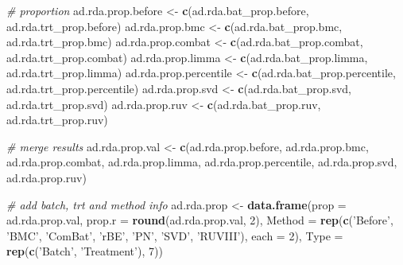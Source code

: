 \documentclass[]{book}
\newenvironment{Shaded}{\begin{snugshade}}{\end{snugshade}}
\newcommand{\KeywordTok}[1]{\textcolor[rgb]{0.13,0.29,0.53}{\textbf{#1}}}
\newcommand{\DataTypeTok}[1]{\textcolor[rgb]{0.13,0.29,0.53}{#1}}
\newcommand{\DecValTok}[1]{\textcolor[rgb]{0.00,0.00,0.81}{#1}}
\newcommand{\StringTok}[1]{\textcolor[rgb]{0.31,0.60,0.02}{#1}}
\newcommand{\CommentTok}[1]{\textcolor[rgb]{0.56,0.35,0.01}{\textit{#1}}}
\newcommand{\OperatorTok}[1]{\textcolor[rgb]{0.81,0.36,0.00}{\textbf{#1}}}
\newcommand{\NormalTok}[1]{#1}
\begin{document}
\begin{Shaded}
\end{Shaded}

\begin{Shaded}
\begin{Highlighting}[]
\CommentTok{# proportion}
\NormalTok{ad.rda.prop.before <-}\StringTok{ }\KeywordTok{c}\NormalTok{(ad.rda.bat_prop.before, ad.rda.trt_prop.before)}
\NormalTok{ad.rda.prop.bmc <-}\StringTok{ }\KeywordTok{c}\NormalTok{(ad.rda.bat_prop.bmc, ad.rda.trt_prop.bmc)}
\NormalTok{ad.rda.prop.combat <-}\StringTok{ }\KeywordTok{c}\NormalTok{(ad.rda.bat_prop.combat, ad.rda.trt_prop.combat)}
\NormalTok{ad.rda.prop.limma <-}\StringTok{ }\KeywordTok{c}\NormalTok{(ad.rda.bat_prop.limma, ad.rda.trt_prop.limma)}
\NormalTok{ad.rda.prop.percentile <-}\StringTok{ }\KeywordTok{c}\NormalTok{(ad.rda.bat_prop.percentile, ad.rda.trt_prop.percentile)}
\NormalTok{ad.rda.prop.svd <-}\StringTok{ }\KeywordTok{c}\NormalTok{(ad.rda.bat_prop.svd, ad.rda.trt_prop.svd)}
\NormalTok{ad.rda.prop.ruv <-}\StringTok{ }\KeywordTok{c}\NormalTok{(ad.rda.bat_prop.ruv, ad.rda.trt_prop.ruv)}

\CommentTok{# merge results}
\NormalTok{ad.rda.prop.val <-}\StringTok{ }\KeywordTok{c}\NormalTok{(ad.rda.prop.before, ad.rda.prop.bmc, }
\NormalTok{                    ad.rda.prop.combat, ad.rda.prop.limma, }
\NormalTok{                    ad.rda.prop.percentile, ad.rda.prop.svd, }
\NormalTok{                    ad.rda.prop.ruv)}

\CommentTok{# add batch, trt and method info}
\NormalTok{ad.rda.prop <-}\StringTok{ }\KeywordTok{data.frame}\NormalTok{(}\DataTypeTok{prop =}\NormalTok{ ad.rda.prop.val, }\DataTypeTok{prop.r =} \KeywordTok{round}\NormalTok{(ad.rda.prop.val, }\DecValTok{2}\NormalTok{), }
                         \DataTypeTok{Method =} \KeywordTok{rep}\NormalTok{(}\KeywordTok{c}\NormalTok{(}\StringTok{'Before'}\NormalTok{, }\StringTok{'BMC'}\NormalTok{, }\StringTok{'ComBat'}\NormalTok{, }\StringTok{'rBE'}\NormalTok{, }
                                        \StringTok{'PN'}\NormalTok{, }\StringTok{'SVD'}\NormalTok{, }\StringTok{'RUVIII'}\NormalTok{), }\DataTypeTok{each =} \DecValTok{2}\NormalTok{), }
                         \DataTypeTok{Type =} \KeywordTok{rep}\NormalTok{(}\KeywordTok{c}\NormalTok{(}\StringTok{'Batch'}\NormalTok{, }\StringTok{'Treatment'}\NormalTok{), }\DecValTok{7}\NormalTok{))}


\end{Highlighting}
\end{Shaded}
\end{document}
